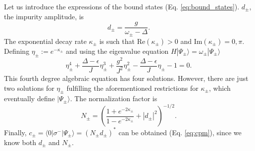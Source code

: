 \documentclass[aps,pra,twocolumn,floatfix,superscriptaddress]{revtex4-1}%
\begin{document}



Let us introduce the expressions of the bound states (Eq. \eqref{eq:bound_states}). $d_\pm$, the impurity amplitude, is
\begin{equation}
d_\pm = \frac{g}{\omega_\pm - \Delta}.\label{eq:d_bound_states}
\end{equation}
The exponential decay rate $\kappa_\pm$ is such that $\text{Re}(\kappa_\pm)>0$ and $\text{Im}(\kappa_\pm)=0,\pi$. Defining $\eta_\pm := e^{-\kappa_\pm}$ and using the eigenvalue equation $H|\Psi_\pm\rangle = \omega_\pm|\Psi_\pm\rangle$
\begin{equation}\label{eq:eta}
\eta_\pm ^4 + \frac{\Delta-\epsilon}{J} \eta_\pm ^3 + \frac{g^2}{J^2} \eta_\pm ^2 - \frac{\Delta-\epsilon}{J} \eta_\pm - 1 = 0.
\end{equation}
This fourth degree algebraic equation has four solutions. However, there are just two solutions for $\eta_\pm$ fulfilling the aforementioned restrictions for $\kappa_\pm$, which eventually define $|\Psi_\pm\rangle$.
The normalization factor is
\begin{equation}\label{eq:Npm}
N_\pm = \left(\frac{1+e^{-2\kappa_\pm}}{1-e^{-2\kappa_\pm}}+|d_\pm|^2\right)^{-1/2}.
\end{equation}
Finally, $c_\pm=\langle 0|\sigma^-|\Psi_\pm\rangle=(N_\pm d_\pm)^*$ can be obtained (Eq. \eqref{eq:cpm}), since we know both $d_\pm$ and $N_\pm$.

\end{document}
